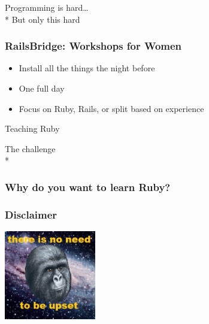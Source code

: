 \documentclass[20pt]{beamer}
\begin{document}
\begin{frame}
\par{}Programming is hard\ldots\\*
\vspace{2cm}
But only this hard
\end{frame}

\begin{frame}
\frametitle{RailsBridge: Workshops for Women}
\begin{itemize}
\item Install all the things the night before
\item One full day
\item Focus on Ruby, Rails, or split based on experience
\end{itemize}
\end{frame}

{
\begin{frame}
\par { Teaching Ruby}\par
\vspace{3cm}\hfill
{The challenge \\*}
\end{frame}
}

\begin{frame}
\frametitle{Why do you want to learn Ruby?}
\begin{itemize}
\end{itemize}
\end{frame}

\begin{frame}
\frametitle{Disclaimer}
\centering \includegraphics[width=4cm]{gorilla}\par
{
}
\end{frame}
\end{document}
